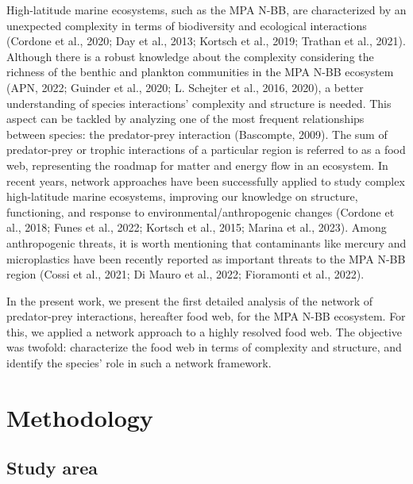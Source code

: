 \documentclass[preprint, 3p,
authoryear]{elsarticle} %
\begin{document}
High-latitude marine ecosystems, such as the MPA N-BB, are characterized
by an unexpected complexity in terms of biodiversity and ecological
interactions (Cordone et al., 2020; Day et al., 2013; Kortsch et al.,
2019; Trathan et al., 2021). Although there is a robust knowledge about
the complexity considering the richness of the benthic and plankton
communities in the MPA N-BB ecosystem (APN, 2022; Guinder et al., 2020;
L. Schejter et al., 2016, 2020), a better understanding of species
interactions' complexity and structure is needed. This aspect can be
tackled by analyzing one of the most frequent relationships between
species: the predator-prey interaction (Bascompte, 2009). The sum of
predator-prey or trophic interactions of a particular region is referred
to as a food web, representing the roadmap for matter and energy flow in
an ecosystem. In recent years, network approaches have been successfully
applied to study complex high-latitude marine ecosystems, improving our
knowledge on structure, functioning, and response to
environmental/anthropogenic changes (Cordone et al., 2018; Funes et al.,
2022; Kortsch et al., 2015; Marina et al., 2023). Among anthropogenic
threats, it is worth mentioning that contaminants like mercury and
microplastics have been recently reported as important threats to the
MPA N-BB region (Cossi et al., 2021; Di Mauro et al., 2022; Fioramonti
et al., 2022).

In the present work, we present the first detailed analysis of the
network of predator-prey interactions, hereafter food web, for the MPA
N-BB ecosystem. For this, we applied a network approach to a highly
resolved food web. The objective was twofold: characterize the food web
in terms of complexity and structure, and identify the species' role in
such a network framework.

\hypertarget{methodology}{%
\section{Methodology}\label{methodology}}

\hypertarget{study-area}{%
\subsection{Study area}\label{study-area}}
\end{document}
